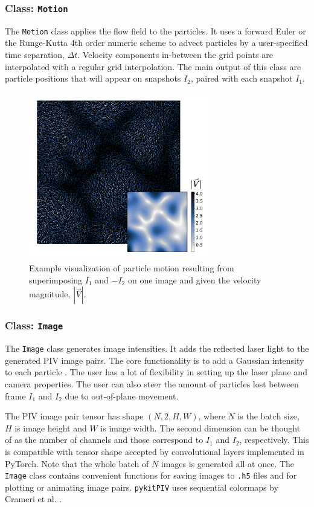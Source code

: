 \documentclass[a4paper,fleqn]{cas-dc}
\begin{document}
\subsubsection{Class: \texttt{Motion}} \label{sec:class-Motion}

The \texttt{Motion} class applies the flow field to the particles. It uses a forward Euler or the Runge-Kutta 4th order numeric scheme to advect particles by a user-specified time separation, $\Delta t$. Velocity components in-between the grid points are interpolated with a regular grid interpolation. The main output of this class are particle positions that will appear on snapshots $I_2$, paired with each snapshot $I_1$.

\begin{figure}[t]
\centering
\includegraphics[width=8cm]{motion-image.pdf}
\caption{Example visualization of particle motion resulting from superimposing $I_1$ and $-I_2$ on one image and given the velocity magnitude, $|\vec{V}|$.}
\label{fig:particle-motion}
\end{figure}

\subsubsection{Class: \texttt{Image}} \label{sec:class-Image}

The \texttt{Image} class generates image intensities. It adds the reflected laser light to the generated PIV image pairs. The core functionality is to add a Gaussian intensity to each particle \citep{olsen2000out, rabault2017performing}. The user has a lot of flexibility in setting up the laser plane and camera properties. The user can also steer the amount of particles lost between frame $I_1$ and $I_2$ due to out-of-plane movement.

The PIV image pair tensor has shape $(N, 2, H, W)$, where $N$ is the batch size, $H$ is image height and $W$ is image width. The second dimension can be thought of as the number of channels and those correspond to $I_1$ and $I_2$, respectively. This is compatible with tensor shape accepted by convolutional layers implemented in PyTorch. Note that the whole batch of $N$ images is generated all at once. The \texttt{Image} class contains convenient functions for saving images to \texttt{.h5} files and for plotting or animating image pairs. \texttt{pykitPIV} uses sequential colormaps by Crameri et al. \cite{crameri2020misuse}.
\end{document}
